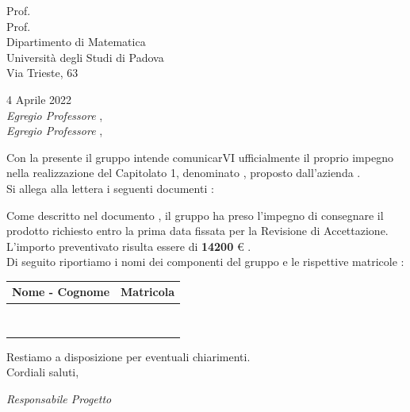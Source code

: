 	\begin{flushright}
		Prof. \Tullio					\\
		Prof. \Ric 						\\
		Dipartimento di Matematica  	\\
		Università degli Studi di Padova\\
		Via Trieste, 63					
	\end{flushright}
	
	\begin{flushleft}
		4 Aprile 2022					\\
		\textit{Egregio Professore \Tullio}, \\
		\textit{Egregio Professore \Ric}, 
	\end{flushleft}
		Con la presente il gruppo \textit{\docNomeTeam} intende comunicarVI ufficialmente il proprio impegno nella realizzazione del Capitolato 1, denominato \textit{\prog}, proposto dall'azienda \textit{\azienda}.\\
		Si allega alla lettera i seguenti documenti :
	
		\documenti
		
		Come descritto nel documento \nor, il gruppo \textit{\docNomeTeam} ha preso l'impegno di consegnare il prodotto richiesto entro la prima data fissata per la Revisione di Accettazione.
		L'importo preventivato risulta essere di \textbf{14200 }€ .
		\\
		\newpage
		Di seguito riportiamo i nomi dei componenti del gruppo e le rispettive matricole :
		\begin{table}[htb]
			\centering
				\begin{tabular} { c c }
					Nome - Cognome & Matricola 		\\
					\hline \hline					\\
					\Ire 	& \MIre					\\
					\Tom 	& \MTom					\\
					\MatE 	& \MMatE				\\
					\Pie 	& \MPie					\\
					\Andre	& \MAndre				\\
					\MatP 	& \MMatP				\\
					\Sam 	& \MSam					\\
				\end{tabular}
		\end{table}
	 
		\begin{flushleft}										
			Restiamo a disposizione per eventuali chiarimenti.		\\
			Cordiali saluti,
		\end{flushleft} 
	
		\begin{flushright}
			\textit{Responsabile Progetto} \\
		\end{flushright}
	\thispagestyle{empty}   